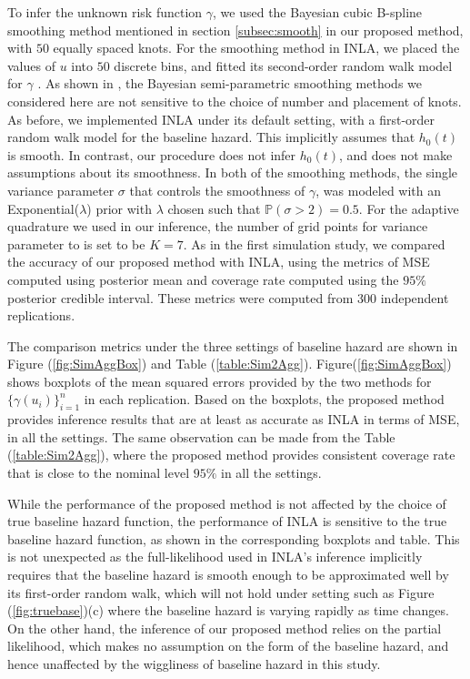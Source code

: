 \documentclass[ba]{imsart}
\begin{document}
To infer the unknown risk function $\gamma$, we used the Bayesian cubic B-spline smoothing method mentioned in section \ref{subsec:smooth} in our proposed method, with $50$ equally spaced knots. For the smoothing method in INLA, we placed the values of $u$ into $50$ discrete bins, and fitted its second-order random walk model for $\gamma$ \citep{rw2}. As shown in \cite{casecross}, the Bayesian semi-parametric smoothing methods we considered here are not sensitive to the choice of number and placement of knots. 
As before, we implemented INLA under its default setting, with a first-order random walk model for the baseline hazard. This implicitly assumes that $h_{0}(t)$ is smooth. In contrast, our procedure does not infer $h_{0}(t)$, and does not make assumptions about its smoothness. In both of the smoothing methods, the single variance parameter $\sigma$ that controls the smoothness of $\gamma$, was modeled with an Exponential($\lambda$) prior with $\lambda$ chosen such that $\mathbb{P}\left( \sigma > 2\right) = 0.5$. For the adaptive quadrature we used in our inference, the number of grid points for variance parameter to is set to be $K = 7$. As in the first simulation study, we compared the accuracy of our proposed method with INLA, using the metrics of MSE computed using posterior mean and coverage rate computed using the $95\%$ posterior credible interval. These metrics were computed from 300 independent replications.

The comparison metrics under the three settings of baseline hazard are shown in Figure (\ref{fig:SimAggBox}) and Table (\ref{table:Sim2Agg}). Figure(\ref{fig:SimAggBox}) shows boxplots of the mean squared errors provided by the two methods for $\{\gamma(u_i)\}_{i=1}^n$ in each replication. Based on the boxplots, the proposed method provides inference results that are at least as accurate as INLA in terms of MSE, in all the settings. The same observation can be made from the Table (\ref{table:Sim2Agg}), where the proposed method provides consistent coverage rate that is close to the nominal level $95\%$ in all the settings. 

While the performance of the proposed method is not affected by the choice of true baseline hazard function, the performance of INLA is sensitive to the true baseline hazard function, as shown in the corresponding boxplots and table. This is not unexpected as the full-likelihood used in INLA's inference implicitly requires that the baseline hazard is smooth enough to be approximated well by its first-order random walk, which will not hold under setting such as Figure (\ref{fig:truebase})(c) where the baseline hazard is varying rapidly as time changes. On the other hand, the inference of our proposed method relies on the partial likelihood, which makes no assumption on the form of the baseline hazard, and hence unaffected by the wiggliness of baseline hazard in this study. 
\end{document}
